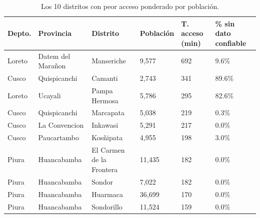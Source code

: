 \begin{table}
\caption{Los 10 distritos con peor acceso ponderado por poblaci\'on.}
\label{tab:distritos_criticos}
\begin{tabular}{llllll}
\toprule
Depto. & Provincia & Distrito & Población & T. acceso (min) & \% sin dato confiable \\
\midrule
Loreto & Datem del Marañon & Manseriche & 9,577 & 692 & 9.6\% \\
Cusco & Quispicanchi & Camanti & 2,743 & 341 & 89.6\% \\
Loreto & Ucayali & Pampa Hermosa & 5,786 & 295 & 82.6\% \\
Cusco & Quispicanchi & Marcapata & 5,038 & 219 & 0.3\% \\
Cusco & La Convencion & Inkawasi & 5,291 & 217 & 0.0\% \\
Cusco & Paucartambo & Kosñipata & 4,955 & 198 & 3.0\% \\
Piura & Huancabamba & El Carmen de la Frontera & 11,435 & 182 & 0.0\% \\
Piura & Huancabamba & Sondor & 7,022 & 182 & 0.0\% \\
Piura & Huancabamba & Huarmaca & 36,699 & 170 & 0.0\% \\
Piura & Huancabamba & Sondorillo & 11,524 & 159 & 0.0\% \\
\bottomrule
\end{tabular}
\end{table}
